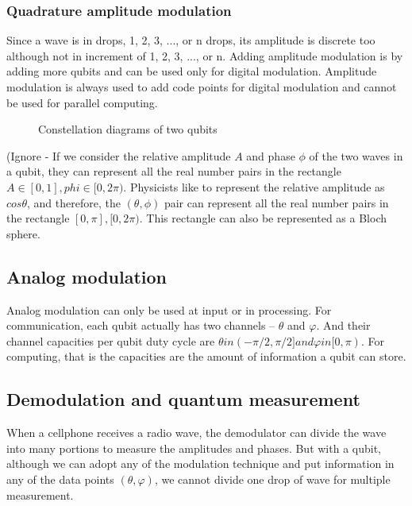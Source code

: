 \documentclass{book}
\begin{document}
\subsubsection{Quadrature amplitude modulation}
Since a wave is in drops, 1, 2, 3, ..., or n drops, its amplitude is discrete too although not in increment of 1, 2, 3, ..., or n. Adding amplitude modulation is by adding more qubits and can be used only for digital modulation. Amplitude modulation is always used to add code points for digital modulation and cannot be used for parallel computing.

\begin{figure}[ht]
\caption{Constellation diagrams of two qubits}
\label{QAM}
\end{figure}

(Ignore - If we consider the relative amplitude $A$ and phase $\phi$ of the two waves in a qubit, they can represent all the real number pairs in the rectangle ${ A \in [0,1], phi \in [0,2\pi) }$. Physicists like to represent the relative amplitude as $cos\theta$, and therefore, the $(\theta, \phi)$ pair can represent all the real number pairs in the rectangle ${[0,\pi],  [0,2\pi)}$. This rectangle can also be represented as a Bloch sphere.

\subsection{Analog modulation}
Analog modulation can only be used at input or in processing. For communication, each qubit actually has two channels -- $\theta$ and $\varphi$. And their channel capacities per qubit duty cycle are $\theta in (-\pi/2, \pi/2] and \varphi in [0, \pi)$. For computing, that is the capacities are the amount of information a qubit can store.

\subsection{Demodulation and quantum measurement}
When a cellphone receives a radio wave, the demodulator can divide the wave into many portions to measure the amplitudes and phases. But with a qubit, although we can adopt any of the modulation technique and put information in any of the data points $(\theta, \varphi)$, we cannot divide one drop of wave for multiple measurement.
\end{document}
